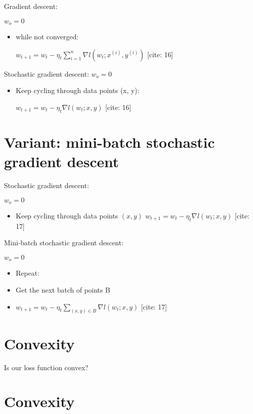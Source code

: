 \documentclass{article}
\begin{document}
Gradient descent:

$w_{o}=0$

\begin{itemize}
    \item while not converged:

     $w_{t+1}=w_{t}-\eta_{t}\sum_{i=1}^{n}\nabla l(w_{t};x^{(i)},y^{(i)})$ [cite: 16]
\end{itemize}

Stochastic gradient descent:
$w_{o}=0$

\begin{itemize}
    \item Keep cycling through data points (x, y):

    $w_{t+1}=w_{t}-\eta_{t}\nabla l(w_{t};x,y)$ [cite: 16]
\end{itemize}

\section{Variant: mini-batch stochastic gradient descent}

Stochastic gradient descent:

$w_{o}=0$

\begin{itemize}
    \item Keep cycling through data points $(x,y)$
    $w_{t+1}=w_{t}-\eta_{t}\nabla l(w_{t};x,y)$  [cite: 17]
\end{itemize}

Mini-batch stochastic gradient descent:

 $w_{o}=0$

\begin{itemize}
    \item Repeat:
    \item Get the next batch of points B
    \item $w_{t+1}=w_{t}-\eta_{t}\sum_{(x,y)\in B}\nabla l(w_{t};x,y)$  [cite: 17]
\end{itemize}

\section{Convexity}

Is our loss function convex?

\section{Convexity}
\end{document}
